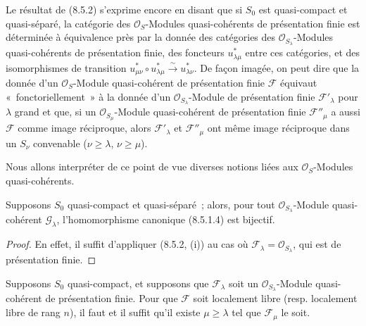 \begin{env}[8.5.3]
\label{IV.8.5.3-fr}
Le résultat de (8.5.2) s'exprime encore en disant que si $S_0$ est
quasi-compact et quasi-séparé, la catégorie des $\mathcal O_S$-Modules
quasi-cohérents de présentation finie est déterminée à équivalence près par la
donnée des catégories des $\mathcal O_{S_\lambda}$-Modules quasi-cohérents de
présentation finie, des foncteurs $u_{\lambda\mu}^*$ entre ces catégories, et
des isomorphismes de transition
$u_{\mu\nu}^*\circ u_{\lambda\mu}^*\xrightarrow{\sim}u_{\lambda\nu}^*$. De façon
imagée, on peut dire que la donnée d'un $\mathcal O_S$-Module quasi-cohérent de
présentation finie $\mathcal F$ équivaut «~fonctoriellement~» à la donnée d'un
$\mathcal O_{S_\lambda}$-Module de présentation finie $\mathcal F'_\lambda$
pour $\lambda$ grand et que, si un $\mathcal O_{S_\mu}$-Module quasi-cohérent de
présentation finie $\mathcal F''_\mu$ a aussi $\mathcal F$ comme image
réciproque, alors $\mathcal F'_\lambda$ et $\mathcal F''_\mu$ ont même image
réciproque dans un $S_\nu$ convenable ($\nu\geq\lambda$, $\nu\geq\mu$).

Nous allons interpréter de ce point de vue diverses notions liées aux
$\mathcal O_S$-Modules quasi-cohérents.
\end{env}

\begin{corollary}[8.5.4]
\label{IV.8.5.4-fr}
Supposons $S_0$ quasi-compact et quasi-séparé~; alors, pour tout
$\mathcal O_{S_\lambda}$-Module quasi-cohérent $\mathcal G_\lambda$,
l'homomorphisme canonique (8.5.1.4) est bijectif.
\end{corollary}

\begin{proof}
En effet, il suffit d'appliquer (8.5.2, (i)) au cas où
$\mathcal F_\lambda=\mathcal O_{S_\lambda}$, qui est de présentation finie.
\end{proof}

\begin{proposition}[8.5.5]
\label{IV.8.5.5-fr}
Supposons $S_0$ quasi-compact, et supposons que $\mathcal F_\lambda$ soit un
$\mathcal O_{S_\lambda}$-Module quasi-cohérent de présentation finie. Pour que
$\mathcal F$ soit localement libre (resp. localement libre de rang $n$), il
faut et il suffit qu'il existe $\mu\geq\lambda$ tel que $\mathcal F_\mu$ le
soit.
\end{proposition}


